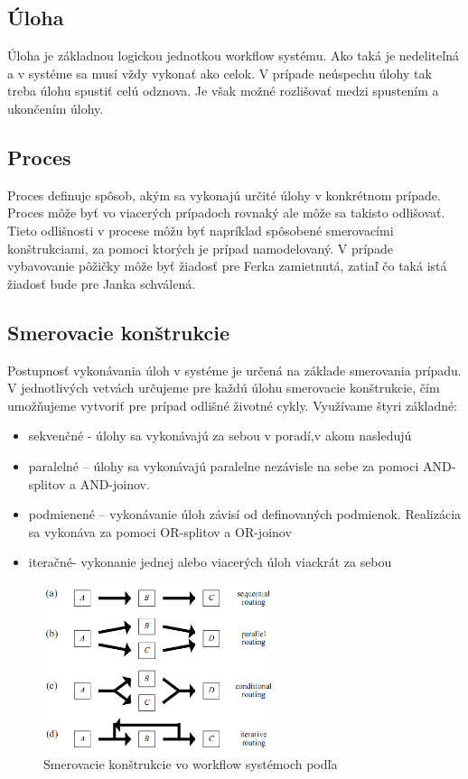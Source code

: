 \subsection{Úloha}
Úloha je základnou logickou jednotkou workflow systému. Ako taká je nedeliteľná a v systéme sa musí vždy vykonať ako celok. V prípade neúspechu úlohy tak treba úlohu spustiť celú odznova. Je však možné rozlišovať medzi spustením a ukončením úlohy. 

\subsection{Proces}
Proces definuje spôsob, akým sa vykonajú určité úlohy v konkrétnom prípade. Proces môže byť vo viacerých prípadoch rovnaký  ale môže sa takisto odlišovať. Tieto odlišnosti v procese môžu byť napríklad spôsobené smerovacími konštrukciami, za pomoci ktorých je prípad namodelovaný. V prípade vybavovanie pôžičky môže byť žiadosť pre Ferka zamietnutá, zatiaľ čo taká istá žiadosť bude pre Janka schválená.

\subsection{Smerovacie konštrukcie}
	Postupnosť vykonávania  úloh v systéme je určená na základe smerovania prípadu. V jednotlivých vetvách určujeme pre každú úlohu smerovacie konštrukcie, čím umožňujeme vytvoriť  pre prípad odlišné životné cykly. Využívame štyri základné: 
\begin{itemize}
	\item sekvenčné - úlohy sa vykonávajú za sebou v poradí,v akom nasledujú
	\item paralelné – úlohy sa vykonávajú paralelne nezávisle na sebe za pomoci AND-splitov a AND-joinov.
	\item podmienené – vykonávanie úloh závisí od definovaných podmienok. Realizácia sa vykonáva za pomoci OR-splitov a OR-joinov
	\item iteračné- vykonanie jednej alebo viacerých úloh viackrát za sebou
\end{itemize}

\begin{figure}[h]
	\centerline{\includegraphics[width=0.6\textwidth]{images/smerovacie_konstrukcie}}
	\caption[smerovacie konštrukcie]{Smerovacie konštrukcie vo workflow systémoch podľa \cite{workflow_systemy}}
	\label{obr:cursus}
\end{figure}

